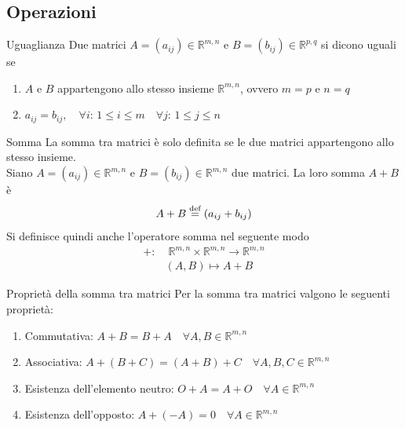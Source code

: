 \subsection{Operazioni}%
\label{sub:operazioni}

\begin{Def}{Uguaglianza}
  Due matrici $A=(a_{ij})\in\mathbb{R}^{m,n}$ e $B=(b_{ij})\in\mathbb{R}^{p,q}$ si dicono
  uguali se
  \begin{enumerate}
    \item $A$ e $B$ appartengono allo stesso insieme $\mathbb{R}^{m,n}$, ovvero $m=p$ e
      $n=q$
    \item $a_{ij} = b_{ij},\quad\forall i:\,1\leq i\leq m \quad\forall j:\,1\leq j\leq n$
  \end{enumerate}
\end{Def}

\begin{Def}{Somma}\label{def:matrice_somma}
  La somma tra matrici è solo definita se le due matrici appartengono allo stesso
  insieme.\\
  Siano $A=(a_{ij})\in\mathbb{R}^{m,n}$ e $B=(b_{ij})\in\mathbb{R}^{m,n}$ due matrici.
  La loro somma $A+B$ è
  \begin{equation*}
    A+B\overset{\text{def}}{=} (a_{ij}+b_{ij})
  \end{equation*}
  Si definisce quindi anche l'operatore somma nel seguente modo
  \begin{align*}
    +:&\;\mathbb{R}^{m,n}\times\mathbb{R}^{m,n}\rightarrow\mathbb{R}^{m,n}\\
      & (A,B)\mapsto A+B
  \end{align*}
\end{Def}

\begin{SubDef}{Proprietà della somma tra matrici}
  Per la somma tra matrici valgono le seguenti proprietà:
  \begin{enumerate}
    \item Commutativa: $A+B = B+A\quad\forall A,B\in\mathbb{R}^{m,n}$
    \item Associativa: $A+(B+C) = (A+B)+C\quad\forall A,B,C\in\mathbb{R}^{m,n}$
    \item Esistenza dell'elemento neutro: $O+A = A+O\quad\forall A\in\mathbb{R}^{m,n}$
    \item Esistenza dell'opposto: $A+(-A) = 0\quad\forall A\in\mathbb{R}^{m,n}$
  \end{enumerate}
\end{SubDef}

